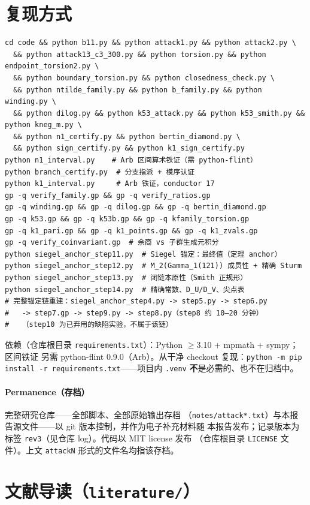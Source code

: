 \documentclass[11pt,a4paper]{ctexart}
\theoremstyle{remark}
\begin{document}
\section{复现方式}\label{sec:reproduce}

{\footnotesize
\begin{verbatim}
cd code && python b11.py && python attack1.py && python attack2.py \
  && python attack13_c3_300.py && python torsion.py && python endpoint_torsion2.py \
  && python boundary_torsion.py && python closedness_check.py \
  && python ntilde_family.py && python b_family.py && python winding.py \
  && python dilog.py && python k53_attack.py && python k53_smith.py && python kneg_m.py \
  && python n1_certify.py && python bertin_diamond.py \
  && python sign_certify.py && python k1_sign_certify.py
python n1_interval.py    # Arb 区间算术铁证（需 python-flint）
python branch_certify.py  # 分支指派 + 模序认证
python k1_interval.py     # Arb 铁证，conductor 17
gp -q verify_family.gp && gp -q verify_ratios.gp
gp -q winding.gp && gp -q dilog.gp && gp -q bertin_diamond.gp
gp -q k53.gp && gp -q k53b.gp && gp -q kfamily_torsion.gp
gp -q k1_pari.gp && gp -q k1_points.gp && gp -q k1_zvals.gp
gp -q verify_coinvariant.gp  # 余商 vs 子群生成元积分
python siegel_anchor_step11.py  # Siegel 锚定：最终值（定理 anchor）
python siegel_anchor_step12.py  # M_2(Gamma_1(121)) 成员性 + 精确 Sturm
python siegel_anchor_step13.py  # 闭链本原性（Smith 正规形）
python siegel_anchor_step14.py  # 精确常数、D_U/D_V、尖点表
# 完整锚定链重建：siegel_anchor_step4.py -> step5.py -> step6.py
#   -> step7.gp -> step9.py -> step8.py（step8 约 10–20 分钟）
#   （step10 为已弃用的缺陷实验，不属于该链）
\end{verbatim}}
依赖（仓库根目录 \texttt{requirements.txt}）：Python $\ge$3.10 + mpmath + sympy；区间铁证
另需 python-flint 0.9.0（Arb）。从干净 checkout 复现：\texttt{python -m pip install -r
requirements.txt}——项目内 \texttt{.venv} \textbf{不}是必需的、也不在归档中。

\paragraph{Permanence（存档）}完整研究仓库——全部脚本、全部原始输出存档
（\texttt{notes/attack*.txt}）与本报告源文件——以 git 版本控制，并作为电子补充材料随
本报告发布；记录版本为标签 \texttt{rev3}（见仓库 log）。代码以 MIT license 发布
（仓库根目录 \texttt{LICENSE} 文件）。上文 \texttt{attackN} 形式的文件名均指该存档。

\section{文献导读（\texttt{literature/}）}
\end{document}
